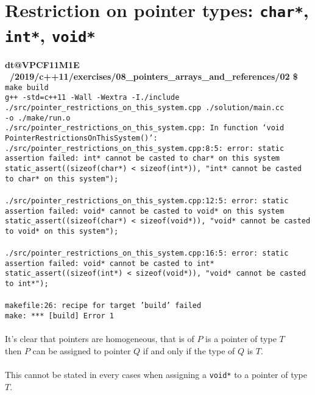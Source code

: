 \documentclass{article}
\begin{document}
 \section*{Restriction on pointer types: \texttt{char*}, \texttt{int*}, \texttt{void*}}
 
  \textbf{dt@VPCF11M1E ~/2019/c++11/exercises/08\_pointers\_arrays\_and\_references/02 \$} \texttt{make build
  \\g++ -std=c++11 -Wall -Wextra -I./include \
  \\./src/pointer\_restrictions\_on\_this\_system.cpp ./solution/main.cc \
  \\-o ./make/run.o
  \\./src/pointer\_restrictions\_on\_this\_system.cpp: In function ‘void PointerRestrictionsOnThisSystem()’:
  \\./src/pointer\_restrictions\_on\_this\_system.cpp:8:5: error: static assertion failed: int* cannot be casted to char* on this system
      \\static\_assert((sizeof(char*) < sizeof(int*)), "int* cannot be casted to char* on this system");
      \\\^
  \\./src/pointer\_restrictions\_on\_this\_system.cpp:12:5: error: static assertion failed: void* cannot be casted to void* on this system
      \\static\_assert((sizeof(char*) < sizeof(void*)), "void* cannot be casted to void* on this system");
      \\\^
  \\./src/pointer\_restrictions\_on\_this\_system.cpp:16:5: error: static assertion failed: void* cannot be casted to int*
      \\static\_assert((sizeof(int*) < sizeof(void*)), "void* cannot be casted to int*");
      \\\^
  \\makefile:26: recipe for target 'build' failed
  \\make: *** [build] Error 1}
  \\
 \\
 It's clear that pointers are homogeneous, that is of $P$ is a pointer of type $T$
 \\
 then $P$ can be assigned to pointer $Q$ if and only if the type of $Q$ is $T$. 
 \\
 \\
 This cannot be stated in every cases when assigning a \texttt{void*} to a pointer of type $T$.
 
 
\end{document}
